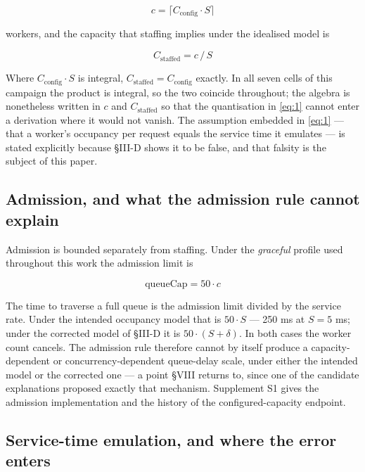 \documentclass{ieeeaccess}
\begin{document}
\begin{equation}
c = \lceil C_{\mathrm{config}} \cdot S \rceil
\label{eq:1}
\end{equation}

workers, and the capacity that staffing implies under the idealised model is

\begin{equation}
C_{\mathrm{staffed}} = c \,/\, S
\label{eq:2}
\end{equation}

Where $C_{\mathrm{config}} \cdot S$ is integral, $C_{\mathrm{staffed}} = C_{\mathrm{config}}$ exactly. In all seven cells of this campaign the product is integral, so the two coincide throughout; the algebra is nonetheless written in $c$ and $C_{\mathrm{staffed}}$ so that the quantisation in \eqref{eq:1} cannot enter a derivation where it would not vanish. The assumption embedded in \eqref{eq:1} --- that a worker's occupancy per request equals the service time it emulates --- is stated explicitly because \S{}III-D shows it to be false, and that falsity is the subject of this paper.

\subsection{Admission, and what the admission rule cannot explain}

Admission is bounded separately from staffing. Under the \textit{graceful} profile used throughout this work the admission limit is

\begin{equation}
\mathrm{queueCap} = 50 \cdot c
\label{eq:3}
\end{equation}

The time to traverse a full queue is the admission limit divided by the service rate. Under the intended occupancy model that is $50 \cdot S$ --- 250 ms at $S = 5$ ms; under the corrected model of \S{}III-D it is $50 \cdot (S + \delta)$. In both cases the worker count cancels. The admission rule therefore cannot by itself produce a capacity-dependent or concurrency-dependent queue-delay scale, under either the intended model or the corrected one --- a point \S{}VIII returns to, since one of the candidate explanations proposed exactly that mechanism. Supplement S1 gives the admission implementation and the history of the configured-capacity endpoint.

\subsection{Service-time emulation, and where the error enters}
\end{document}
